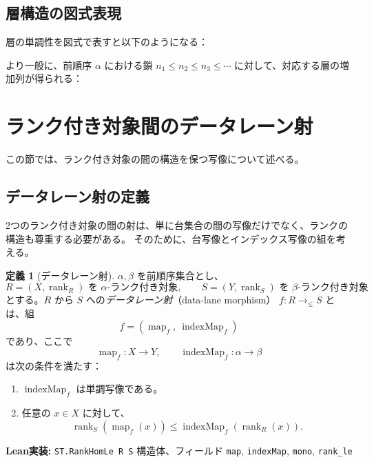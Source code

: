 \documentclass[a4paper,12pt]{ltjsarticle}
\theoremstyle{definition}
\newtheorem{definition}{定義}[section]
\begin{document}
\subsection{層構造の図式表現}

層の単調性を図式で表すと以下のようになる：

\begin{center}
\end{center}

より一般に、前順序 $\alpha$ における鎖 $n_1 \le n_2 \le n_3 \le \cdots$ に対して、対応する層の増加列が得られる：

\begin{center}
\end{center}

\section{ランク付き対象間のデータレーン射}
\label{sec:rankhomle}

この節では、ランク付き対象の間の構造を保つ写像について述べる。

\subsection{データレーン射の定義}

2つのランク付き対象の間の射は、単に台集合の間の写像だけでなく、ランクの構造も尊重する必要がある。
そのために、台写像とインデックス写像の組を考える。

\begin{definition}[データレーン射]
\label{def:rankhomle}
$\alpha, \beta$ を前順序集合とし、
\[
  R = (X, \operatorname{rank}_R) \text{ を $\alpha$-ランク付き対象}, \qquad
  S = (Y, \operatorname{rank}_S) \text{ を $\beta$-ランク付き対象}
\]
とする。$R$ から $S$ への\emph{データレーン射}（data-lane morphism）
$f : R \to_{\le} S$ とは、組
\[
  f = (\operatorname{map}_f,\ \operatorname{indexMap}_f)
\]
であり、ここで
\[
  \operatorname{map}_f : X \to Y, \qquad \operatorname{indexMap}_f : \alpha \to \beta
\]
は次の条件を満たす：
\begin{enumerate}
\item $\operatorname{indexMap}_f$ は単調写像である。
\item 任意の $x \in X$ に対して、
\[
  \operatorname{rank}_S(\operatorname{map}_f(x)) \le \operatorname{indexMap}_f(\operatorname{rank}_R(x)).
\]
\end{enumerate}

\textbf{Lean実装:} \texttt{ST.RankHomLe R S} 構造体、フィールド
\texttt{map}, \texttt{indexMap}, \texttt{mono}, \texttt{rank\_le}
\end{definition}
\end{document}
